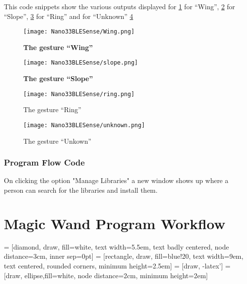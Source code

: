 This code snippets show the various outputs displayed for \ref{wing} for ``Wing'', \ref{slope} for ``Slope'', \ref{ring} for ``Ring'' and for ``Unknown'' \ref{unknown} 

\begin{figure}[h!]
    \texttt{[image: Nano33BLESense/Wing.png]}
    \caption{\textbf{The gesture ``Wing''}}
    \label{wing}
\end{figure}

\begin{figure}[h!]
    \texttt{[image: Nano33BLESense/slope.png]}
    \caption{\textbf{The gesture ``Slope''}}
    \label{slope}
\end{figure}

\begin{figure}[h!]
    \texttt{[image: Nano33BLESense/ring.png]}
    \caption{The  gesture ``Ring''}
    \label{ring}
\end{figure}

\begin{figure}[h!]
    \texttt{[image: Nano33BLESense/unknown.png]}
    \caption{The gesture ``Unkown''}
    \label{unknown}
\end{figure}










\bigskip
\newpage







\subsection{Program Flow Code}

On clicking the option "Manage Libraries" a new window shows up where a person can search for the libraries and install them.

\chapter{Magic Wand Program Workflow}



 = [diamond, draw, fill=white, 
text width=5.5em, text badly centered, node distance=3cm, inner sep=0pt]
 = [rectangle, draw, fill=blue!20, 
text width=9em, text centered, rounded corners, minimum height=2.5em]
 = [draw, -latex']
 = [draw, ellipse,fill=white, node distance=2cm,
minimum height=2em]

